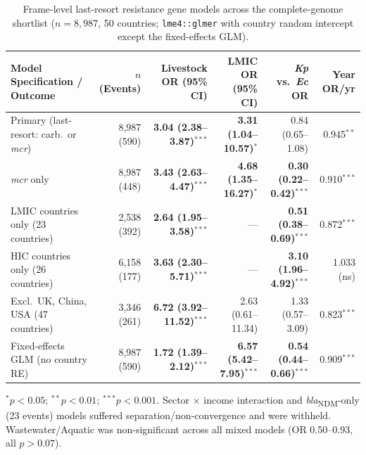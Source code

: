 \documentclass[11pt,a4paper]{article}
\begin{document}
\begin{table}[!htbp]
\centering
\caption{Frame-level last-resort resistance gene models across the complete-genome shortlist ($n = 8{,}987$, 50 countries; \texttt{lme4::glmer} with country random intercept except the fixed-effects GLM).}
\label{tab:m6}
\footnotesize
\setlength{\tabcolsep}{4pt}
\begin{tabularx}{\linewidth}{@{}X r r r r r@{}}
\toprule
\textbf{Model Specification / Outcome} & \textbf{$n$ (Events)} & \textbf{Livestock OR (95\% CI)} & \textbf{LMIC OR (95\% CI)} & \textbf{\textit{Kp} vs.\ \textit{Ec} OR} & \textbf{Year OR/yr} \\
\midrule
Primary (last-resort: carb.\ or \textit{mcr}) & 8,987 (590) & \textbf{3.04 (2.38--3.87)}$^{***}$ & \textbf{3.31 (1.04--10.57)}$^{*}$ & 0.84 (0.65--1.08) & 0.945$^{**}$ \\
\textit{mcr} only & 8,987 (448) & \textbf{3.43 (2.63--4.47)}$^{***}$ & \textbf{4.68 (1.35--16.27)}$^{*}$ & \textbf{0.30 (0.22--0.42)}$^{***}$ & 0.910$^{***}$ \\
LMIC countries only (23 countries) & 2,538 (392) & \textbf{2.64 (1.95--3.58)}$^{***}$ & --- & \textbf{0.51 (0.38--0.69)}$^{***}$ & 0.872$^{***}$ \\
HIC countries only (26 countries) & 6,158 (177) & \textbf{3.63 (2.30--5.71)}$^{***}$ & --- & \textbf{3.10 (1.96--4.92)}$^{***}$ & 1.033 (ns) \\
Excl.\ UK, China, USA (47 countries) & 3,346 (261) & \textbf{6.72 (3.92--11.52)}$^{***}$ & 2.63 (0.61--11.34) & 1.33 (0.57--3.09) & 0.823$^{***}$ \\
Fixed-effects GLM (no country RE) & 8,987 (590) & \textbf{1.72 (1.39--2.12)}$^{***}$ & \textbf{6.57 (5.42--7.95)}$^{***}$ & \textbf{0.54 (0.44--0.66)}$^{***}$ & 0.909$^{***}$ \\
\bottomrule
\end{tabularx}
\vspace{2pt}
\raggedright\footnotesize{$^{*}p < 0.05$; $^{**}p < 0.01$; $^{***}p < 0.001$. Sector $\times$ income interaction and \textit{bla}\textsubscript{NDM}-only (23 events) models suffered separation/non-convergence and were withheld. Wastewater/Aquatic was non-significant across all mixed models (OR 0.50--0.93, all $p > 0.07$).}
\end{table}
\end{document}
